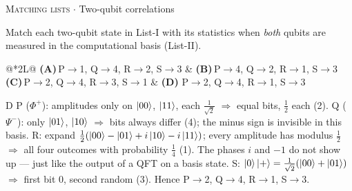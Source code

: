 \documentclass[11pt,a4paper]{article}
\newcommand{\optlabel}[1]{\textbf{(#1)}}
\newcommand{\correctlabel}[1]{\textcolor{okgreen}{\textbf{(#1)}\,\ding{51}}}
\newenvironment{qitem}[1]{\begin{list}{}{\setlength{\leftmargin}{3.3em}\setlength{\labelwidth}{3.1em}%
  \setlength{\labelsep}{0.2em}\setlength{\topsep}{3pt}\setlength{\parsep}{3pt}}\item[\textbf{Q.#1}\hfill]}{\end{list}}
\newcommand{\qsep}{\par\vspace{2pt}{\color{black!15}\hrule}\vspace{4pt}}
\newcommand{\qmeta}[2]{{\footnotesize\color{black!60}\textsc{#1} \;$\cdot$\; #2}\par}
\begin{document}
\begin{qitem}{36}
\qmeta{Matching lists}{Two-qubit correlations}
Match each two-qubit state in List-I with its statistics when \emph{both} qubits are measured in the computational
basis (List-II).
\par\smallskip{}
\par\smallskip\noindent\begin{tabularx}{\linewidth}{@{}*{2}{L}@{}}
\optlabel{A}\,P$\to$1, Q$\to$4, R$\to$2, S$\to$3 & \optlabel{B}\,P$\to$4, Q$\to$2, R$\to$1, S$\to$3 \\[3pt]
\optlabel{C}\,P$\to$2, Q$\to$4, R$\to$3, S$\to$1 & \correctlabel{D}\,P$\to$2, Q$\to$4, R$\to$1, S$\to$3
\end{tabularx}
\end{qitem}
\begin{solbox}{D}
P ($\Phi^+$): amplitudes only on $\ket{00}$, $\ket{11}$, each $\frac{1}{\sqrt2}$ $\Rightarrow$ equal bits, $\frac12$ each (2).
Q ($\Psi^-$): only $\ket{01}$, $\ket{10}$ $\Rightarrow$ bits always differ (4); the minus sign is invisible in this basis.
R: expand $\frac12(\ket{00} - \ket{01} + i\ket{10} - i\ket{11})$; every amplitude has modulus $\frac12$ $\Rightarrow$ all four outcomes
with probability $\frac14$ (1). The phases $i$ and $-1$ do not show up --- just like the output of a QFT on a basis state.
S: $\ket0\ket{+} = \frac{1}{\sqrt2}(\ket{00} + \ket{01})$ $\Rightarrow$ first bit 0, second random (3).
Hence P$\to$2, Q$\to$4, R$\to$1, S$\to$3.
\end{solbox}
\qsep
\end{document}
